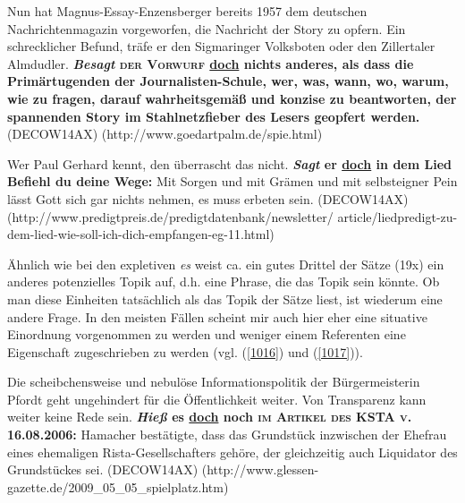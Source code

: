 {\begin{exe}
	\ex\label{1014} 
	\scriptsize
	Nun hat Magnus-Essay-Enzensberger bereits 1957 dem deutschen Nachrichtenmagazin vorgeworfen, die Nachricht der Story zu opfern. Ein schrecklicher Befund, träfe er den Sigmaringer Volksboten oder den Zillertaler Almdudler. \textbf{\textit{Besagt} \textsc{der Vorwurf} \underline{doch} nichts anderes, als dass die Primärtugenden der Journalisten-Schule, \glqq wer, was, wann, wo, warum, wie\grqq{} zu fragen, darauf wahrheitsgemäß und konzise zu beantworten, der spannenden Story im Stahlnetzfieber des Lesers geopfert werden.		}
	\newline
	\hbox{}\hfill\hbox {(DECOW14AX)}
	\newline
	\hbox{}\hfill\hbox{(http://www.goedartpalm.de/spie.html)}
\end{exe}	

\begin{exe}
	\ex\label{1015} 
	\scriptsize
	Wer Paul Gerhard kennt, den überrascht das nicht. \textbf{\textit{Sagt} er \underline{doch} in dem Lied \glqq Befiehl du deine Wege\grqq{}:} Mit Sorgen 	und mit Grämen und mit selbsteigner Pein lässt Gott sich gar nichts nehmen, es muss erbeten sein. 		
	\hfill\hbox {(DECOW14AX)}
	\newline
	\hbox{}\hfill\hbox{(http://www.predigtpreis.de/predigtdatenbank/newsletter/}
	\newline
	\hbox{}\hfill\hbox{article/liedpredigt-zu-dem-lied-wie-soll-ich-dich-empfangen-eg-11.html)}	
\end{exe}									         
Ähnlich wie bei den expletiven \textit{es} weist ca. ein gutes Drittel der Sätze (19x) ein anderes potenzielles Topik auf, d.h. eine Phrase, die das  Topik sein könnte. Ob man diese Einheiten tatsächlich als das Topik der Sätze liest, ist wiederum eine andere Frage. In den meisten Fällen scheint mir auch hier eher eine situative Einordnung vorgenommen zu werden und weniger einem Referenten eine Eigenschaft zugeschrieben zu werden (vgl. (\ref{1016}) und (\ref{1017})).					                     
		
\begin{exe}
	\ex\label{1016} 
	\scriptsize
	Die scheibchensweise und nebulöse Informationspolitik der Bürgermeisterin Pfordt geht ungehindert für die Öffentlichkeit weiter. Von Transparenz kann weiter keine Rede sein. \textbf{\textit{Hieß} es \underline{doch} noch \textsc{im Artikel des KSTA v. 16.08.2006}:} Hamacher bestätigte, dass das Grundstück inzwischen der Ehefrau eines ehemaligen Rista-Gesellschafters gehöre, der gleichzeitig auch Liquidator des Grundstückes sei. 			
	\newline
	\hbox{}\hfill\hbox {(DECOW14AX)}
	\newline
	\hbox{}\hfill\hbox{(http://www.glessen-gazette.de/2009\_05\_05\_spielplatz.htm)}	
\end{exe}		

}
